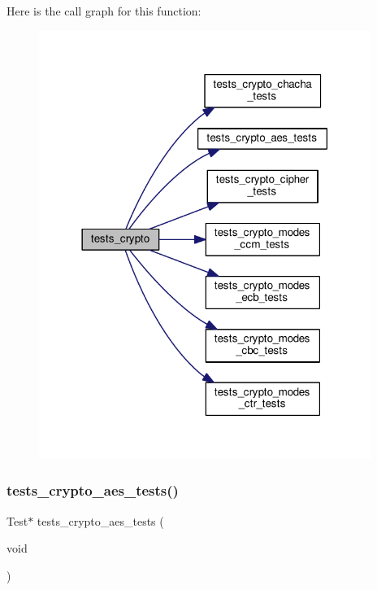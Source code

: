 Here is the call graph for this function\+:
\nopagebreak
\begin{figure}[H]
\begin{center}
\leavevmode
\includegraphics[width=306pt]{group__unittests_ga910f269e2fc5cd756415b49feb82eaca_cgraph}
\end{center}
\end{figure}
\mbox{\label{group__unittests_ga19bbedd30b2147c5418e225af2ce5d73}} 
\subsubsection{\texorpdfstring{tests\+\_\+crypto\+\_\+aes\+\_\+tests()}{tests\_crypto\_aes\_tests()}}
{\footnotesize\ttfamily Test$\ast$ tests\+\_\+crypto\+\_\+aes\+\_\+tests (\begin{DoxyParamCaption}\item[{void}]{ }\end{DoxyParamCaption})}


